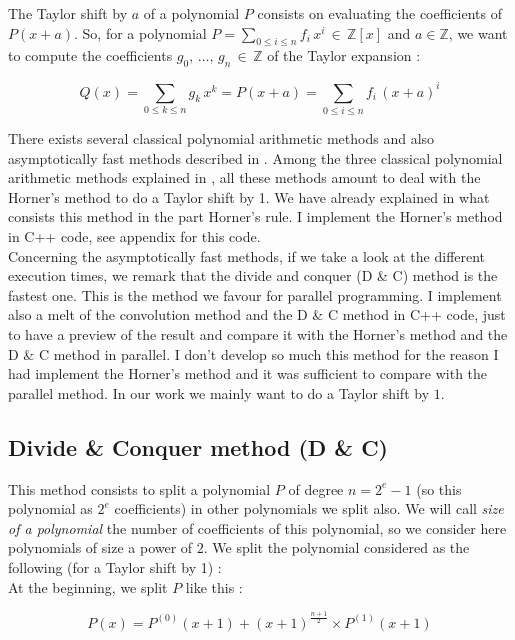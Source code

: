 The Taylor shift by $a$ of a polynomial $P$ consists on evaluating the coefficients of $P(x+a)$. So, for a polynomial $P=\sum_{0\leq i \leq n} f_i\,x^i\, \in \, \mathbb{Z}[x]$ and $a\in\mathbb{Z}$, we want to compute the coefficients $g_0,\,\dots,\,g_n\,\in\,\mathbb{Z}$ of the Taylor expansion :

$$Q(x)=\sum_{0\leq k \leq n}g_k\, x^k=P(x+a)=\sum_{0\leq i \leq n}f_i\, (x+a)^i$$ 

There exists several classical polynomial arithmetic methods and also asymptotically fast methods described in \cite{Gerhard}. Among the three classical polynomial arithmetic methods explained in \cite{Gerhard}, all these methods amount to deal with the Horner's method to do a Taylor shift by 1. We have already explained in what consists this method in the part Horner's rule. I implement the Horner's method in C++ code, see appendix for this code.\\

Concerning the asymptotically fast methods, if we take a look at the different execution times, we remark that the divide and conquer (D \& C) method is the fastest one. This is the method we favour for parallel programming. I implement also a melt of the convolution method and the D \& C method in C++ code, just to have a preview of the result and compare it with the Horner's method and the D \& C method in parallel. I don't develop so much this method for the reason I had implement the Horner's method and it was sufficient to compare with the parallel method. In our work we mainly want to do a Taylor shift by $1$.

\subsection{Divide \& Conquer method (D \& C)}
This method consists to split a polynomial $P$ of degree $n=2^e-1$ (so this polynomial as $2^e$ coefficients) in other polynomials we split also. We will call \textit{size of a polynomial} the number of coefficients of this polynomial, so we consider here polynomials of size a power of $2$. We split the polynomial considered as the following (for a Taylor shift by 1) :\\

At the beginning, we split $P$ like this :

$$P(x) = P^{(0)}(x+1)+(x+1)^{\frac{n+1}{2}}\times P^{(1)}(x+1)$$

